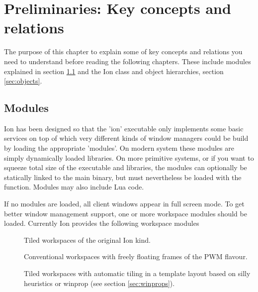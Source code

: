 
\chapter{Preliminaries: Key concepts and relations}
\label{chap:prelim}

The purpose of this chapter to explain some of key concepts and
relations you need to understand before reading the following
chapters. These include modules explained in section \ref{sec:modules}
and the Ion class and object hierarchies, section \ref{sec:objects}.


\section{Modules}
\label{sec:modules}

Ion has been designed so that the 'ion' executable only implements some
basic services on top of which very different kinds of window managers
could be build by loading the appropriate 'modules'. On modern system
these modules are simply dynamically loaded  libraries. On 
more primitive systems, or if you want to squeeze total size of the 
executable and libraries, the modules can optionally be statically 
linked to the main binary, but must nevertheless be loaded with the
 function. Modules may also include Lua code.

If no modules are loaded, all client windows appear in full screen mode.
To get better window management support, one or more workspace modules
should be loaded. Currently Ion provides the following workspace modules

\begin{description}
    \item[] Tiled workspaces of the original Ion kind.
    \item[] Conventional workspaces with freely floating
      frames of the PWM flavour.
    \item[] Tiled workspaces with automatic tiling in a
      template layout based on silly heuristics or winprop (see section
      \ref{sec:winprops}).
\end{description}

